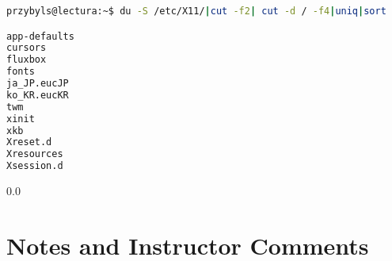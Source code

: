 \documentclass[11pt,notitlepage]{article}
\begin{document}
\begin{lstlisting}[language=bash,basicstyle=\scriptsize,backgroundcolor=\color{ubergray},caption={trnapp-config.xml},frame=single,breaklines=true]
przybyls@lectura:~$ du -S /etc/X11/|cut -f2| cut -d / -f4|uniq|sort

app-defaults
cursors
fluxbox
fonts
ja_JP.eucJP
ko_KR.eucKR
twm
xinit
xkb
Xreset.d
Xresources
Xsession.d
\end{lstlisting}

\newpage
  {\setlength{\baselineskip}%
           {0.0\baselineskip}
  \section*{Notes and Instructor Comments}
  \hrulefill \par}
\end{document}
